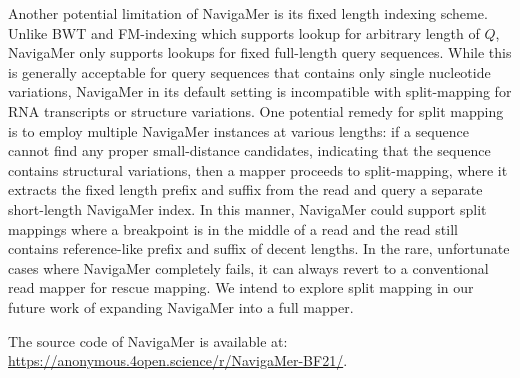\documentclass[unnumsec,webpdf,contemporary,large]{oup-authoring-template}%
\theoremstyle{thmstyleone}%
\theoremstyle{thmstyletwo}%
\theoremstyle{thmstylethree}%
\begin{document}
Another potential limitation of NavigaMer is its fixed length indexing scheme.
Unlike BWT and FM-indexing which supports lookup for arbitrary length of $Q$,
NavigaMer only supports lookups for fixed full-length query sequences.
While this is generally acceptable for query sequences that contains only single nucleotide variations,
NavigaMer in its default setting is incompatible with split-mapping for RNA transcripts or structure variations.
One potential remedy for split mapping is to employ multiple NavigaMer instances at various lengths:
if a sequence cannot find any proper small-distance candidates,
indicating that the sequence contains structural variations,
then a mapper proceeds to split-mapping,
where it extracts the fixed length prefix and suffix from the read and query a separate short-length NavigaMer index.
In this manner, NavigaMer could support split mappings where a breakpoint is in the middle of a read and the read still contains reference-like prefix and suffix of decent lengths.
In the rare, unfortunate cases where NavigaMer completely fails,
it can always revert to a conventional read mapper for rescue mapping.
We intend to explore split mapping in our future work of expanding NavigaMer into a full mapper.

The source code of NavigaMer is available at: \url{https://anonymous.4open.science/r/NavigaMer-BF21/}.





\end{document}
